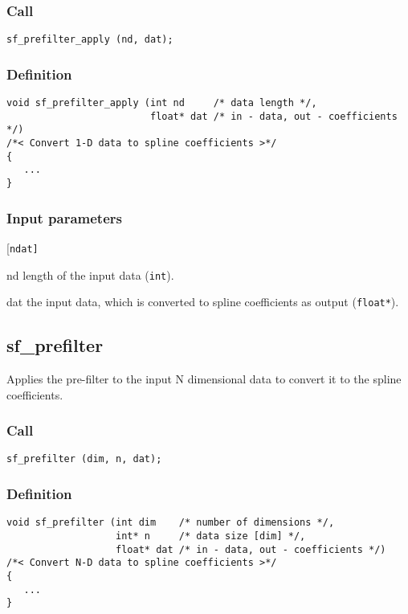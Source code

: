 \subsubsection*{Call}
\begin{verbatim}sf_prefilter_apply (nd, dat);\end{verbatim}

\subsubsection*{Definition}
\begin{verbatim}
void sf_prefilter_apply (int nd     /* data length */, 
                         float* dat /* in - data, out - coefficients */)
/*< Convert 1-D data to spline coefficients >*/
{
   ...
}
\end{verbatim}

\subsubsection*{Input parameters}
\begin{desclist}{\tt }{\quad}[\tt ndat]
   \setlength\itemsep{0pt}
   \item[nd] length of the input data (\texttt{int}). 
   \item[dat] the input data, which is converted to spline coefficients as output (\texttt{float*}).  
\end{desclist}




\subsection{{sf\_prefilter}}
Applies the pre-filter to the input N dimensional data to convert it to the spline coefficients.

\subsubsection*{Call}
\begin{verbatim}sf_prefilter (dim, n, dat);\end{verbatim}

\subsubsection*{Definition}
\begin{verbatim}
void sf_prefilter (int dim    /* number of dimensions */, 
                   int* n     /* data size [dim] */, 
                   float* dat /* in - data, out - coefficients */)
/*< Convert N-D data to spline coefficients >*/
{
   ...
}
\end{verbatim}

